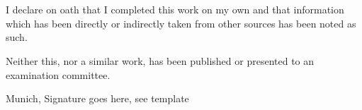 \documentclass[document.tex]{subfiles}
\begin{document}
\clearpage\thispagestyle{empty}
\section*{\statutorytitle}
I declare on oath that I completed this work on my own and that information which has been directly or indirectly taken from other sources has been noted as such.

Neither this, nor a similar work, has been published or presented to an examination committee.

Munich, \mydate\newline
Signature goes here, see template
\makeatletter \@author
\end{document}
